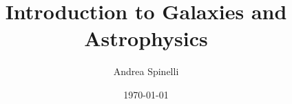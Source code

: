 \documentclass[a4paper,12pt]{report}
\institute{UniTs - University of Trieste}
\title{Introduction to Galaxies and Astrophysics}
\author{Andrea Spinelli}
\date{\today}
\begin{document}
\maketitle



\toc






\printbibliography
\end{document}
